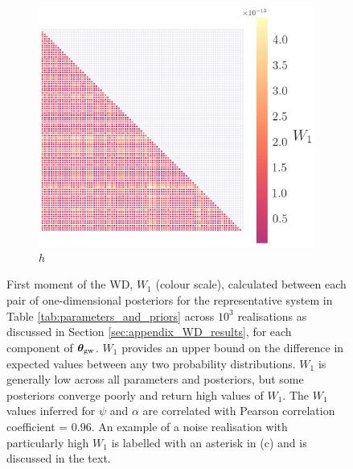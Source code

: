 \documentclass[fleqn,usenatbib,useAMS]{mnras}
\begin{document}
\begin{figure}
\begin{subfigure}[b]{0.3\textwidth}
		\includegraphics[width=\textwidth]{images/WD_6}
		\caption{$h$}
	\end{subfigure}
	\caption{First moment of the WD, $W_1$ (colour scale), calculated between each pair of one-dimensional posteriors for the representative system in Table \ref{tab:parameters_and_priors} across $10^3$ realisations as discussed in Section \ref{sec:appendix_WD_results}, for each component of $\boldsymbol{\theta}_{\rm gw}$. $W_1$ provides an upper bound on the difference in expected values between any two probability distributions. $W_1$ is generally low across all parameters and posteriors, but some posteriors converge poorly and return high values of $W_1$. The $W_1$ values inferred for $\psi$ and $\alpha$ are correlated with Pearson correlation coefficient = 0.96. An example of a noise realisation with particularly high $W_1$ is labelled with an asterisk in (c) and is discussed in the text.} \label{fig:pairwise_wasserstein}
\end{figure}
\end{document}
